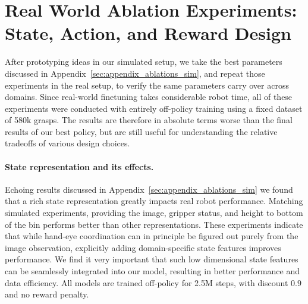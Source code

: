 \documentclass{article}
\begin{document}


\newpage

\appendix



\section{Real World Ablation Experiments: State, Action, and Reward Design}
\label{sec:appendix_ablations_real}
After prototyping ideas in our simulated setup, we take the best parameters discussed in Appendix~\ref{sec:appendix_ablations_sim}, and repeat those experiments in the real setup, to verify the same parameters carry over across domains. Since real-world finetuning takes considerable robot time, all of these experiments were conducted with entirely off-policy training using a fixed dataset of 580k grasps. The results are therefore in absolute terms worse than the final results of our best policy, but are still useful for understanding the relative tradeoffs of various design choices.

\vspace{-0.1in}\paragraph{State representation and its effects.}

Echoing results discussed in Appendix~\ref{sec:appendix_ablations_sim} we found that a rich state representation greatly impacts real robot performance. Matching simulated experiments, providing the image, gripper status, and height to bottom of the bin performs better than other representations. These experiments indicate that while hand-eye coordination can in principle be figured out purely from the image observation, explicitly adding domain-specific state features improves performance. We find it very important that such low dimensional state features can be seamlessly integrated into our model, resulting in better performance and data efficiency. All models are trained off-policy for 2.5M steps, with discount $0.9$ and no reward penalty.
\end{document}
